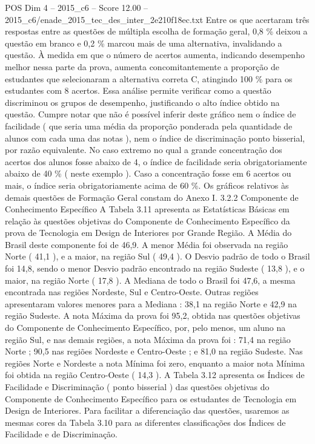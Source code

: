 \begin{textsample}{POS Dim 4 – 2015\_c6 – Score 12.00 – 2015\_c6/enade\_2015\_tec\_des\_inter\_2e210f18ec.txt}
Entre os que acertaram três respostas entre as questões de múltipla escolha de formação geral, 0,8 \% deixou a questão em branco e 0,2 \% marcou mais de uma alternativa, invalidando a questão.
À medida em que o número de acertos aumenta, indicando desempenho melhor nessa parte da prova, aumenta concomitantemente a proporção de estudantes que selecionaram a alternativa correta C, atingindo 100 \% para os estudantes com 8 acertos.
Essa análise permite verificar como a questão discriminou os grupos de desempenho, justificando o alto índice obtido na questão.
Cumpre notar que não é possível inferir deste gráfico nem o índice de facilidade ( que seria uma média da proporção ponderada pela quantidade de alunos com cada uma das notas ), nem o índice de discriminação ponto bisserial, por razão equivalente.
No caso extremo no qual a grande concentração dos acertos dos alunos fosse abaixo de 4, o índice de facilidade seria obrigatoriamente abaixo de 40 \% ( neste exemplo ).
Caso a concentração fosse em 6 acertos ou mais, o índice seria obrigatoriamente acima de 60 \%.
Os gráficos relativos às demais questões de Formação Geral constam do Anexo I. 3.2.2 Componente de Conhecimento Específico A Tabela 3.11 apresenta as Estatísticas Básicas em relação às questões objetivas do Componente de Conhecimento Específico da prova de Tecnologia em Design de Interiores por Grande Região.
A Média do Brasil deste componente foi de 46,9.
A menor Média foi observada na região Norte ( 41,1 ), e a maior, na região Sul ( 49,4 ).
O Desvio padrão de todo o Brasil foi 14,8, sendo o menor Desvio padrão encontrado na região Sudeste ( 13,8 ), e o maior, na região Norte ( 17,8 ).
A Mediana de todo o Brasil foi 47,6, a mesma encontrada nas regiões Nordeste, Sul e Centro-Oeste.
Outras regiões apresentaram valores menores para a Mediana : 38,1 na região Norte e 42,9 na região Sudeste.
A nota Máxima da prova foi 95,2, obtida nas questões objetivas do Componente de Conhecimento Específico, por, pelo menos, um aluno na região Sul, e nas demais regiões, a nota Máxima da prova foi : 71,4 na região Norte ; 90,5 nas regiões Nordeste e Centro-Oeste ; e 81,0 na região Sudeste.
Nas regiões Norte e Nordeste a nota Mínima foi zero, enquanto a maior nota Mínima foi obtida na região Centro-Oeste ( 14,3 ).
A Tabela 3.12 apresenta os Índices de Facilidade e Discriminação ( ponto bisserial ) das questões objetivas do Componente de Conhecimento Específico para os estudantes de Tecnologia em Design de Interiores.
Para facilitar a diferenciação das questões, usaremos as mesmas cores da Tabela 3.10 para as diferentes classificações dos Índices de Facilidade e de Discriminação.

\end{textsample}
